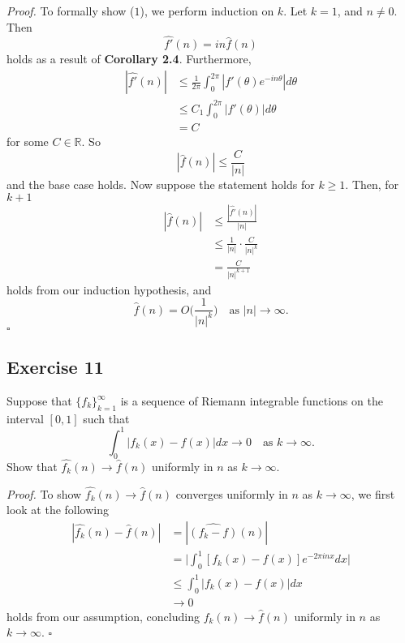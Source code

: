 \documentclass[12pt]{article}
\newenvironment{proof}{\textit{Proof.}}{\hfill$\square$}
\newcommand{\bbr}{\mathbb{R}}
\begin{document}
\vspace{2em}
\begin{proof}
    To formally show ($1$), we perform induction on $k$. Let $k=1$, and $n\ne0$. Then
    \begin{equation*}
        \hat{f'}(n)=in\hat{f}(n)
    \end{equation*}
    holds as a result of \textbf{Corollary 2.4}. Furthermore,
    \begin{align*}
        |\hat{f'}(n)|&\le\frac{1}{2\pi}\int_{0}^{2\pi}|f'(\theta)e^{-in\theta}|d\theta \\
        &\le C_1\int_{0}^{2\pi}|f'(\theta)|d\theta \\
        &= C
    \end{align*}
    for some $C\in\bbr$. So
    \begin{equation*}
        |\hat{f}(n)|\le\frac{C}{|n|}
    \end{equation*}
    and the base case holds. Now suppose the statement holds for $k\ge1$. Then, for $k+1$
    \begin{align*}
        |\hat{f}(n)|&\le\frac{|\hat{f'}(n)|}{|n|} \\
        &\le\frac{1}{|n|}\cdot\frac{C}{|n|^k} \\
        & = \frac{C}{|n|^{k+1}}
    \end{align*}
    holds from our induction hypothesis, and
    \begin{equation*}
        \hat{f}(n)=O\Bigg(\frac{1}{|n|^k}\Bigg)\hspace{1em}\text{as }|n|\to\infty.
    \end{equation*}
\end{proof}
\newpage

\subsection*{Exercise 11}
Suppose that $\{f_k\}_{k=1}^\infty$ is a sequence of Riemann integrable functions on the interval $[0,1]$
such that 
\begin{equation*}
    \int_{0}^{1}|f_k(x)-f(x)|dx\to0\hspace{1em}\text{as }k\to\infty.
\end{equation*}
Show that $\hat{f_k}(n)\to\hat{f}(n)$ uniformly in $n$ as $k\to\infty$.

\vspace{2em}
\begin{proof}
    To show $\hat{f_k}(n)\to\hat{f}(n)$ converges uniformly in $n$ as $k\to\infty$, we first look at the following
    \begin{align*}
        |\hat{f_k}(n)-\hat{f}(n)|&=|\widehat{(f_k-f)}(n)| \\
        &=\Big|\int_{0}^{1}[f_k(x)-f(x)]e^{-2\pi inx}dx\Big| \\
        &\le\int_{0}^{1}|f_k(x)-f(x)|dx \\
        &\to 0
    \end{align*}
    holds from our assumption, concluding $\hat{f_k}(n)\to\hat{f}(n)$ uniformly in $n$ as $k\to\infty$.
\end{proof}
\newpage
\end{document}
